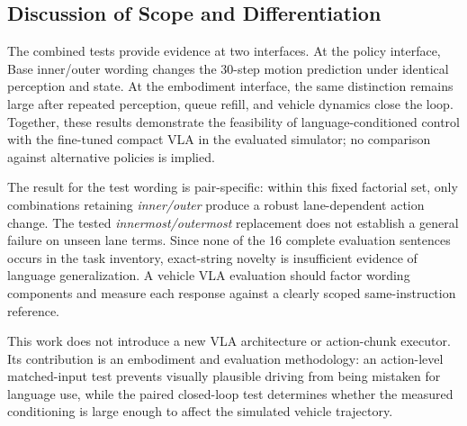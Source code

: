 \documentclass[letterpaper,conference]{IEEEtran}
\begin{document}
\subsection{Discussion of Scope and Differentiation}
The combined tests provide evidence at two interfaces. At the policy
interface, Base inner/outer wording changes the 30-step motion prediction
under identical perception and state. At the embodiment interface, the same
distinction remains large after repeated perception, queue refill, and vehicle
dynamics close the loop. Together, these results demonstrate the feasibility
of language-conditioned control with the fine-tuned compact VLA in the
evaluated simulator; no comparison against alternative policies is implied.

The result for the test wording is pair-specific: within this fixed factorial
set, only combinations retaining \emph{inner/outer} produce a robust
lane-dependent action change. The tested \emph{innermost/outermost} replacement
does not establish a general failure on unseen lane terms. Since none of the 16
complete evaluation sentences occurs in the task inventory, exact-string
novelty is insufficient evidence of language generalization. A vehicle VLA
evaluation should factor wording components and measure each response against a
clearly scoped same-instruction reference.

This work does not introduce a new VLA architecture or action-chunk executor.
Its contribution is an embodiment and evaluation methodology: an action-level
matched-input test prevents visually plausible driving from being mistaken for
language use, while the paired closed-loop test determines whether the measured
conditioning is large enough to affect the simulated vehicle trajectory.
\end{document}
